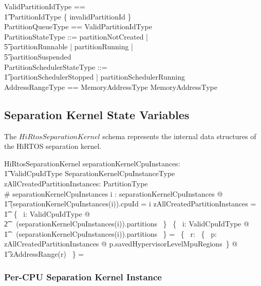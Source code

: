\documentclass[11pt,letterpaper,twoside,openany]{book}
\begin{document}
\begin{zed}
    ValidPartitionIdType == \\
    \t1 PartitionIdType \setminus \{ invalidPartitionId \} \\
    PartitionQueueType == \iseq ValidPartitionIdType \\
    PartitionStateType ::= partitionNotCreated | \\
    \t5 partitionRunnable | partitionRunning | \\
    \t5 partitionSuspended \\
    PartitionSchedulerStateType ::= \\
    \t1 partitionSchedulerStopped | partitionSchedulerRunning \\
    AddressRangeType == MemoryAddressType \cross MemoryAddressType \\
\end{zed}

\subsection{Separation Kernel State Variables}

The $HiRtosSeparationKernel$ schema represents the internal data
structures of the HiRTOS separation kernel.

\begin{schema}{HiRtosSeparationKernel}
    separationKernelCpuInstances: \\
    \t1 ValidCpuIdType \finj SeparationKernelCpuInstanceType \\
    zAllCreatedPartitionInstances: \finset PartitionType \\
\where
    \# separationKernelCpuInstances 
\also
    \forall i : \dom separationKernelCpuInstances @ \\
\t1   (separationKernelCpuInstances(i)).cpuId = i
\also
    zAllCreatedPartitionInstances = \\
\t1    \bigcup~\{~ i: ValidCpuIdType @ \\
\t2    \ran~ (separationKernelCpuInstances(i)).partitions ~\}
\also
    \bigcap~\{~ i: ValidCpuIdType @ \\
\t1    \ran~ (separationKernelCpuInstances(i)).partitions ~\} = \emptyset
\also
    \bigcap~\{~ r: \bigcup~\{~ p: zAllCreatedPartitionInstances @ p.savedHypervisorLevelMpuRegions~\} @ \\
    \t1 zAddressRange(r) ~\} = \emptyset
\end{schema}

\subsubsection{Per-CPU Separation Kernel Instance}
\end{document}
